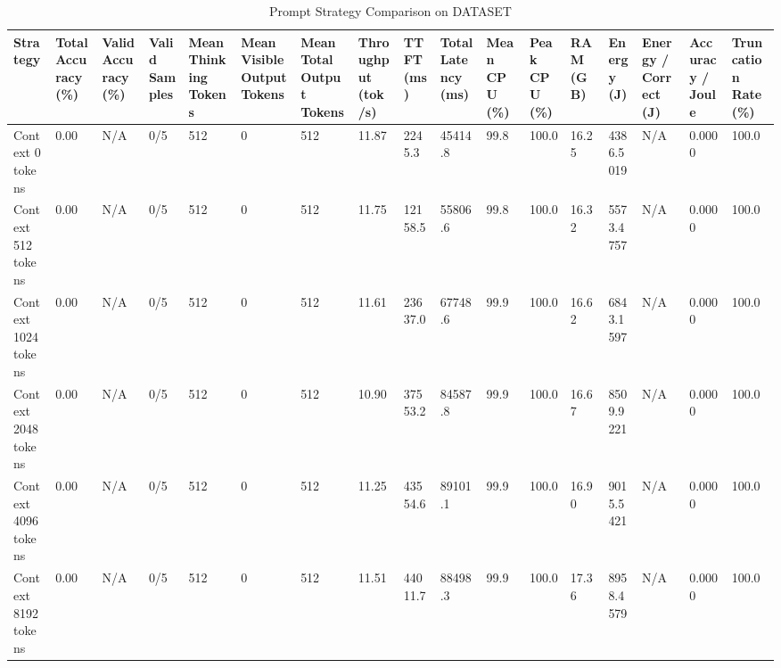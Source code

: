 \begin{table}
\caption{Prompt Strategy Comparison on DATASET}
\label{tab:strategy_comparison}
\begin{tabular}{lllllllllllllllll}
\toprule
Strategy & Total Accuracy (\%) & Valid Accuracy (\%) & Valid Samples & Mean Thinking Tokens & Mean Visible Output Tokens & Mean Total Output Tokens & Throughput (tok/s) & TTFT (ms) & Total Latency (ms) & Mean CPU (\%) & Peak CPU (\%) & RAM (GB) & Energy (J) & Energy / Correct (J) & Accuracy / Joule & Truncation Rate (\%) \\
\midrule
Context 0 tokens & 0.00 & N/A & 0/5 & 512 & 0 & 512 & 11.87 & 2245.3 & 45414.8 & 99.8 & 100.0 & 16.25 & 4386.5019 & N/A & 0.0000 & 100.0 \\
Context 512 tokens & 0.00 & N/A & 0/5 & 512 & 0 & 512 & 11.75 & 12158.5 & 55806.6 & 99.8 & 100.0 & 16.32 & 5573.4757 & N/A & 0.0000 & 100.0 \\
Context 1024 tokens & 0.00 & N/A & 0/5 & 512 & 0 & 512 & 11.61 & 23637.0 & 67748.6 & 99.9 & 100.0 & 16.62 & 6843.1597 & N/A & 0.0000 & 100.0 \\
Context 2048 tokens & 0.00 & N/A & 0/5 & 512 & 0 & 512 & 10.90 & 37553.2 & 84587.8 & 99.9 & 100.0 & 16.67 & 8509.9221 & N/A & 0.0000 & 100.0 \\
Context 4096 tokens & 0.00 & N/A & 0/5 & 512 & 0 & 512 & 11.25 & 43554.6 & 89101.1 & 99.9 & 100.0 & 16.90 & 9015.5421 & N/A & 0.0000 & 100.0 \\
Context 8192 tokens & 0.00 & N/A & 0/5 & 512 & 0 & 512 & 11.51 & 44011.7 & 88498.3 & 99.9 & 100.0 & 17.36 & 8958.4579 & N/A & 0.0000 & 100.0 \\
\bottomrule
\end{tabular}
\end{table}
